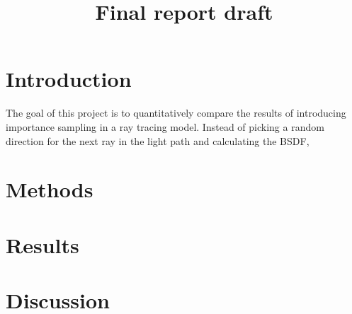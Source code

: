 \documentclass[12pt]{article}
\title{Final report draft}
\begin{document}
\maketitle
\begin{abstract}

\end{abstract}

\section{Introduction}
	The goal of this project is to quantitatively compare the results of introducing importance sampling in a ray tracing model. Instead of picking a random direction for the next ray in the light path and calculating the BSDF, 
    
\section{Methods}



\section{Results}

\section{Discussion}
\end{document}
